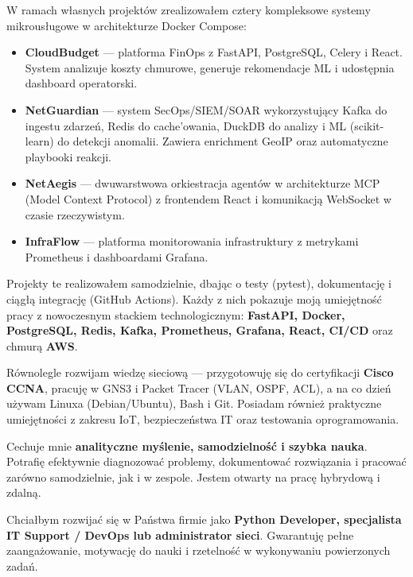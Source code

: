 \documentclass[11pt,a4paper]{article}
\begin{document}
\begin{minipage}[t]{0.68\paperwidth}
\begin{minipage}[t]{0.9\textwidth}
W ramach własnych projektów zrealizowałem cztery kompleksowe systemy mikrousługowe w architekturze Docker Compose:

\begin{itemize}
  \item \textbf{CloudBudget} --- platforma FinOps z FastAPI, PostgreSQL, Celery i React. System analizuje koszty chmurowe, generuje rekomendacje ML i udostępnia dashboard operatorski.
  \item \textbf{NetGuardian} --- system SecOps/SIEM/SOAR wykorzystujący Kafka do ingestu zdarzeń, Redis do cache'owania, DuckDB do analizy i ML (scikit-learn) do detekcji anomalii. Zawiera enrichment GeoIP oraz automatyczne playbooki reakcji.
  \item \textbf{NetAegis} --- dwuwarstwowa orkiestracja agentów w architekturze MCP (Model Context Protocol) z frontendem React i komunikacją WebSocket w czasie rzeczywistym.
  \item \textbf{InfraFlow} --- platforma monitorowania infrastruktury z metrykami Prometheus i dashboardami Grafana.
\end{itemize}

Projekty te realizowałem samodzielnie, dbając o testy (pytest), dokumentację i ciągłą integrację (GitHub Actions). Każdy z nich pokazuje moją umiejętność pracy z nowoczesnym stackiem technologicznym: \textbf{FastAPI, Docker, PostgreSQL, Redis, Kafka, Prometheus, Grafana, React, CI/CD} oraz chmurą \textbf{AWS}.

\vspace{0.4em}

Równolegle rozwijam wiedzę sieciową --- przygotowuję się do certyfikacji \textbf{Cisco CCNA}, pracuję w GNS3 i Packet Tracer (VLAN, OSPF, ACL), a na co dzień używam Linuxa (Debian/Ubuntu), Bash i Git. Posiadam również praktyczne umiejętności z zakresu IoT, bezpieczeństwa IT oraz testowania oprogramowania.

\vspace{0.4em}

Cechuje mnie \textbf{analityczne myślenie, samodzielność i szybka nauka}. Potrafię efektywnie diagnozować problemy, dokumentować rozwiązania i pracować zarówno samodzielnie, jak i w zespole. Jestem otwarty na pracę hybrydową i zdalną.

\vspace{0.4em}

Chciałbym rozwijać się w Państwa firmie jako \textbf{Python Developer, specjalista IT Support / DevOps lub administrator sieci}. Gwarantuję pełne zaangażowanie, motywację do nauki i rzetelność w wykonywaniu powierzonych zadań.


\end{minipage}
\end{minipage}
\end{document}
